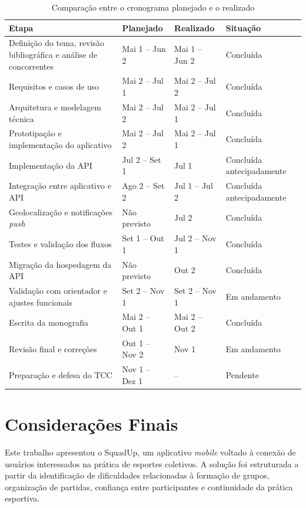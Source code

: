 \documentclass[a4paper, 12pt]{article}
\begin{document}
\begin{justify}
\begin{table}[H]
\centering
\caption{Comparação entre o cronograma planejado e o realizado}
\label{tab:cronograma_realizado}
\small
\begin{tabular}{|p{5.4cm}|p{2.6cm}|p{2.6cm}|p{2.6cm}|}
\hline
\textbf{Etapa} & \textbf{Planejado} & \textbf{Realizado} & \textbf{Situação} \\
\hline
Definição do tema, revisão bibliográfica e análise de concorrentes & Mai 1 -- Jun 2 & Mai 1 -- Jun 2 & Concluída \\
\hline
Requisitos e casos de uso & Mai 2 -- Jul 1 & Mai 2 -- Jul 2 & Concluída \\
\hline
Arquitetura e modelagem técnica & Mai 2 -- Jul 2 & Mai 2 -- Jul 1 & Concluída \\
\hline
Prototipação e implementação do aplicativo & Mai 2 -- Jul 2 & Mai 2 -- Jul 1 & Concluída \\
\hline
Implementação da API & Jul 2 -- Set 1 & Jul 1 & Concluída antecipadamente \\
\hline
Integração entre aplicativo e API & Ago 2 -- Set 2 & Jul 1 -- Jul 2 & Concluída antecipadamente \\
\hline
Geolocalização e notificações \textit{push} & Não previsto & Jul 2 & Concluída \\
\hline
Testes e validação dos fluxos & Set 1 -- Out 1 & Jul 2 -- Nov 1 & Concluída \\
\hline
Migração da hospedagem da API & Não previsto & Out 2 & Concluída \\
\hline
Validação com orientador e ajustes funcionais & Set 2 -- Nov 1 & Set 2 -- Nov 1 & Em andamento \\
\hline
Escrita da monografia & Mai 2 -- Out 1 & Mai 2 -- Out 2 & Concluída \\
\hline
Revisão final e correções & Out 1 -- Nov 2 & Nov 1 & Em andamento \\
\hline
Preparação e defesa do TCC & Nov 1 -- Dez 1 & -- & Pendente \\
\hline
\end{tabular}
\end{table}

\clearpage

\section{Considerações Finais}

Este trabalho apresentou o SquadUp, um aplicativo \textit{mobile} voltado à conexão de usuários interessados na prática de esportes coletivos. A solução foi estruturada a partir da identificação de dificuldades relacionadas à formação de grupos, organização de partidas, confiança entre participantes e continuidade da prática esportiva.


\end{justify}
\end{document}
